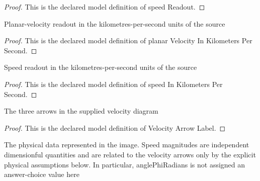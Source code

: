 \begin{proof}
  This is the declared model definition of speed Readout.
\end{proof}
\begin{definition}
  \label{def:physics:phyx-mini-0524:phyxminiproblems-problemphyxmini0524-planarvelocityinkilometerspersecond}
  Planar-velocity readout in the kilometres-per-second units of the source
\end{definition}
\begin{proof}
  This is the declared model definition of planar Velocity In Kilometers Per Second.
\end{proof}
\begin{definition}
  \label{def:physics:phyx-mini-0524:phyxminiproblems-problemphyxmini0524-speedinkilometerspersecond}
  Speed readout in the kilometres-per-second units of the source
\end{definition}
\begin{proof}
  This is the declared model definition of speed In Kilometers Per Second.
\end{proof}
\begin{definition}
  \label{def:physics:phyx-mini-0524:phyxminiproblems-problemphyxmini0524-velocityarrowlabel}
  The three arrows in the supplied velocity diagram
\end{definition}
\begin{proof}
  This is the declared model definition of Velocity Arrow Label.
\end{proof}
\begin{definition}
  \label{def:physics:phyx-mini-0524:phyxminiproblems-problemphyxmini0524-etherwindvelocitydiagram}
  The physical data represented in the image. Speed magnitudes are independent dimensionful quantities and are related to the velocity arrows only by the explicit physical assumptions below. In particular, anglePhiRadians is not assigned an answer-choice value here
\end{definition}
